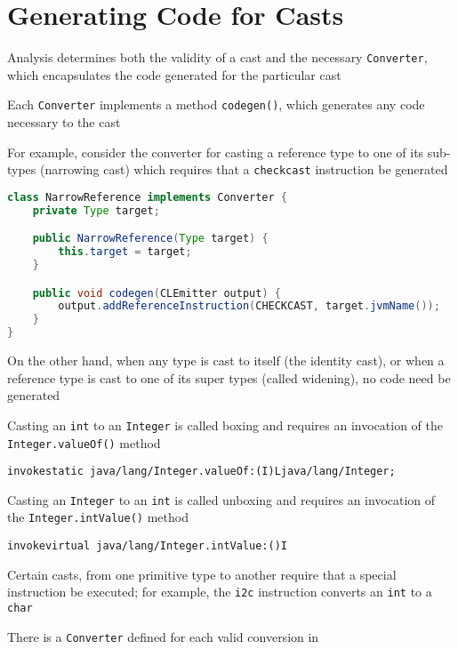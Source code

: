 \documentclass[8pt,a4paper,compress]{beamer}
\begin{document}
\section{Generating Code for Casts}
\begin{frame}[fragile]
\pause

Analysis determines both the validity of a cast and the necessary \lstinline{Converter}, which encapsulates the code generated for the particular cast

\pause
\bigskip

Each \lstinline{Converter} implements a method \lstinline{codegen()}, which generates any code necessary to the cast

\pause
\bigskip

For example, consider the converter for casting a reference type to one of its sub-types (narrowing cast) which requires that a \lstinline{checkcast} instruction be generated
\begin{lstlisting}[language=Java,style=focusin]
class NarrowReference implements Converter {
    private Type target;

    public NarrowReference(Type target) {
        this.target = target;
    }

    public void codegen(CLEmitter output) {
        output.addReferenceInstruction(CHECKCAST, target.jvmName());
    }
}
\end{lstlisting}

\pause
\bigskip

On the other hand, when any type is cast to itself (the identity cast), or when a reference type is cast to one of its super types (called widening), no code need be generated
\end{frame}

\begin{frame}[fragile]
\pause

Casting an \lstinline{int} to an \lstinline{Integer} is called boxing and requires an invocation of the \lstinline{Integer.valueOf()} method

\begin{lstlisting}[language={},style=focusin]
invokestatic java/lang/Integer.valueOf:(I)Ljava/lang/Integer;
\end{lstlisting}

\pause
\bigskip

Casting an \lstinline{Integer} to an \lstinline{int} is called unboxing and requires an invocation of the \lstinline{Integer.intValue()} method

\begin{lstlisting}[language={},style=focusin]
invokevirtual java/lang/Integer.intValue:()I
\end{lstlisting}

\pause
\bigskip

Certain casts, from one primitive type to another require that a special instruction be executed; for example, the \lstinline{i2c} instruction converts an \lstinline{int} to a \lstinline{char}

\pause
\bigskip

There is a \lstinline{Converter} defined for each valid conversion in \jmm
\end{frame}
\end{document}

